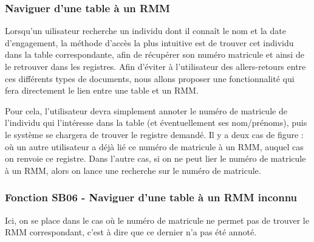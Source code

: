 \documentclass[a4paper]{article}
\begin{document}
\subsubsection{Naviguer d'une table à un RMM}

Lorsqu'un uilisateur recherche un individu dont il connaît le nom et la date d'engagement, la méthode d'accès la plus intuitive est de trouver cet individu dans la table correspondante, afin de récupérer son numéro matricule et ainsi de le retrouver dans les registres. Afin d'éviter à l'utilisateur des allers-retours entre ces différents types de documents, nous allons proposer une fonctionnalité qui fera directement le lien entre une table et un RMM.

Pour cela, l'utilisateur devra simplement annoter le numéro de matricule de l'individu qui l'intéresse dans la table (et éventuellement ses nom/prénoms), puis le système se chargera de trouver le registre demandé. Il y a deux cas de figure : où un autre utilisateur a déjà lié ce numéro de matricule à un RMM, auquel cas on renvoie ce registre. Dans l'autre cas, si on ne peut lier le numéro de matricule à un RMM, alors on lance une recherche sur le numéro de matricule. 

\subsubsection{Fonction SB06 - Naviguer d'une table à un RMM inconnu}

Ici, on se place dans le cas où le numéro de matricule ne permet pas de trouver le RMM correspondant, c'est à dire que ce dernier n'a pas été annoté. 
\end{document}
